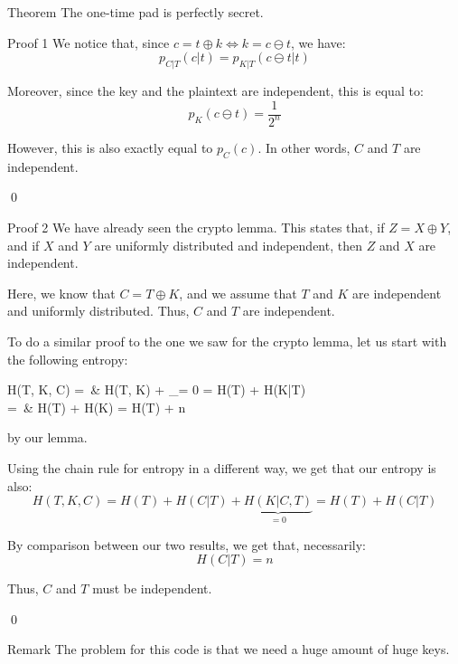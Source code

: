 \documentclass[a4paper]{article}
\begin{document}
\begin{parag}{Theorem}
    The one-time pad is perfectly secret.

    \begin{subparag}{Proof 1}
        We notice that, since $c = t \oplus k \iff k = c \ominus t$, we have: 
        \[p_{C|T}\left(c|t\right) = p_{K|T}\left(c \ominus t | t\right)\]
        
        Moreover, since the key and the plaintext are independent, this is equal to:
        \[p_{K}\left(c \ominus t\right) = \frac{1}{2^n}\]

        However, this is also exactly equal to $p_C\left(c\right)$. In other words, $C$ and $T$ are independent.

        \qed
    \end{subparag}

    \begin{subparag}{Proof 2}
        We have already seen the crypto lemma. This states that, if $Z = X \oplus Y$, and if $X$ and $Y$ are uniformly distributed and independent, then $Z$ and $X$ are independent.

        Here, we know that $C = T\oplus K$, and we assume that $T$ and $K$ are independent and uniformly distributed. Thus, $C$ and $T$ are independent.

        To do a similar proof to the one we saw for the crypto lemma, let us start with the following entropy: 
        \begin{multiequality}
        H\left(T, K, C\right) =\ & H\left(T, K\right) + _{= 0} = H\left(T\right) + H\left(K|T\right) \\
        =\ & H\left(T\right) + H\left(K\right) = H\left(T\right) + n 
        \end{multiequality}
        by our lemma.
        
        Using the chain rule for entropy in a different way, we get that our entropy is also: 
        \[H\left(T, K, C\right) = H\left(T\right) + H\left(C | T\right) + \underbrace{H\left(K | C, T\right)}_{= 0} = H\left(T\right) + H\left(C|T\right)\]

        By comparison between our two results, we get that, necessarily: 
        \[H\left(C|T\right) = n\]
        
        Thus, $C$ and $T$ must be independent.

        \qed
    \end{subparag}
    

    \begin{subparag}{Remark}
        The problem for this code is that we need a huge amount of huge keys.
    \end{subparag}
\end{parag}
\end{document}
